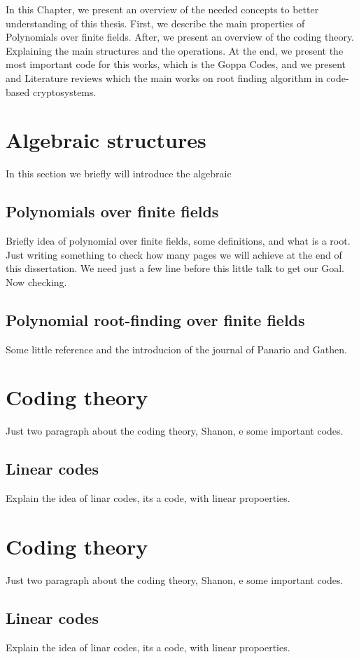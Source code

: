 In this Chapter, we present an overview of the needed concepts to better understanding of this thesis. First, we describe the main properties of Polynomials over finite fields. After, we present an overview of the coding theory. Explaining the main structures and the operations. At the end, we present the most important code for this works, which is the Goppa Codes, and we present and Literature reviews which the main works on root finding algorithm in code-based cryptosystems. 
\section{Algebraic structures}
In this section we briefly will introduce the algebraic 

\subsection{Polynomials over finite fields}
Briefly idea of polynomial over finite fields, some definitions, and what is a root. Just writing something to check how many pages we will achieve at the end of this dissertation. We need just a few line before this little talk to get our Goal. Now checking.

\subsection{Polynomial root-finding over finite fields}
Some little reference and the introducion of the journal of Panario and Gathen.

\section{Coding theory}
Just two paragraph about the coding theory, Shanon, e some important codes.

\subsection{Linear codes}
Explain the idea of linar codes, its a code, with linear propoerties. 
\section{Coding theory}
Just two paragraph about the coding theory, Shanon, e some important codes.

\subsection{Linear codes}
Explain the idea of linar codes, its a code, with linear propoerties. 

